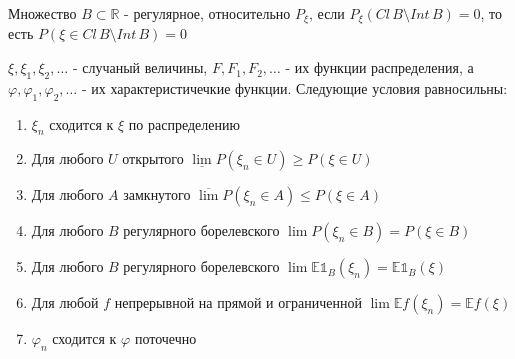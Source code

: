 \begin{definition}
    Множество $B \subset \mathbb{R}$ - регулярное, относительно $P_{\xi}$, если $P_{\xi} (Cl \, B \setminus Int \, B) = 0$, 
    то есть $P(\xi \in Cl \, B \setminus Int \, B) = 0$
\end{definition}

\begin{theorem}
    $\xi, \xi_1, \xi_2, \ldots$ - случаный величины, $F, F_1, F_2, \ldots$ - их функции распределения, а
    $\varphi, \varphi_1, \varphi_2, \ldots$ - их характеристичечкие функции. Следующие условия равносильны:

    \begin{enumerate}
        \item $\xi_n$ сходится к $\xi$ по распределению
        \item Для любого $U$ открытого $\underline{\lim} P(\xi_n \in U) \geqslant P(\xi \in U)$
        \item Для любого $A$ замкнутого $\overline{\lim} P(\xi_n \in A) \leqslant P(\xi \in A)$
        \item Для любого $B$ регулярного борелевского $\lim P(\xi_n \in B) = P(\xi \in B)$
        \item Для любого $B$ регулярного борелевского $\lim \mathbb{E} \mathds{1}_{B}(\xi_n) = \mathbb{E} \mathds{1}_B (\xi)$
        \item Для любой $f$ непрерывной на прямой и ограниченной $\lim \mathbb{E} f(\xi_n) = \mathbb{E} f(\xi)$
        \item $\varphi_n$ сходится к $\varphi$ поточечно
    \end{enumerate}
\end{theorem}

